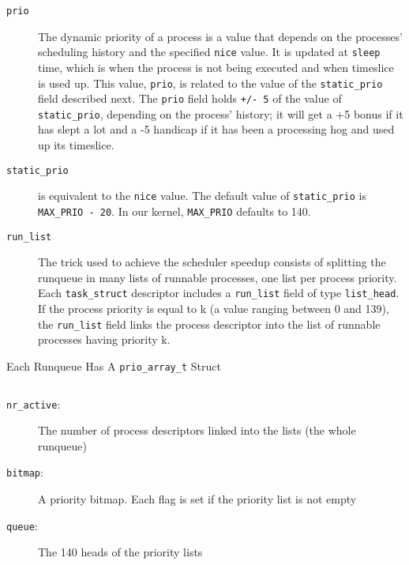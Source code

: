 \begin{description}
\item[\texttt{prio}] The dynamic priority of a process is a value that depends on the
  processes' scheduling history and the specified \texttt{nice} value. It is updated at
  \texttt{sleep} time, which is when the process is not being executed and when timeslice is
  used up. This value, \texttt{prio}, is related to the value of the \texttt{static\_prio}
  field described next. The \texttt{prio} field holds \texttt{+/- 5} of the value of
  \texttt{static\_prio}, depending on the process' history; it will get a +5 bonus if it has
  slept a lot and a -5 handicap if it has been a processing hog and used up its
  timeslice. 
\item[\texttt{static\_prio}] is equivalent to the \texttt{nice} value. The default value of
  \texttt{static\_prio} is \texttt{MAX\_PRIO - 20}. In our kernel, \texttt{MAX\_PRIO} defaults
  to 140. 
\item[\texttt{run\_list}] The trick used to achieve the scheduler speedup consists of
  splitting the runqueue in many lists of runnable processes, one list per process
  priority. Each \texttt{task\_struct} descriptor includes a \texttt{run\_list} field of type
  \texttt{list\_head}. If the process priority is equal to k (a value ranging between 0 and
  139), the \texttt{run\_list} field links the process descriptor into the list of runnable
  processes having priority k. 
\end{description}

\begin{frame}[fragile=singleslide]{Each Runqueue Has A \texttt{prio\_array\_t} Struct}
  \begin{center}
    \begin{varwidth}{.8\textwidth}
      \inputminted{c}{../figs/prio-array-t.c}
    \end{varwidth}
  \end{center}
  \begin{description}
  \item[\texttt{nr\_active}:] The number of process descriptors linked into the lists (the
    whole runqueue)
  \item[\texttt{bitmap}:] A priority bitmap. Each flag is set if the priority list is not
    empty
  \item[\texttt{queue}:] The 140 heads of the priority lists
  \end{description}
\end{frame}


